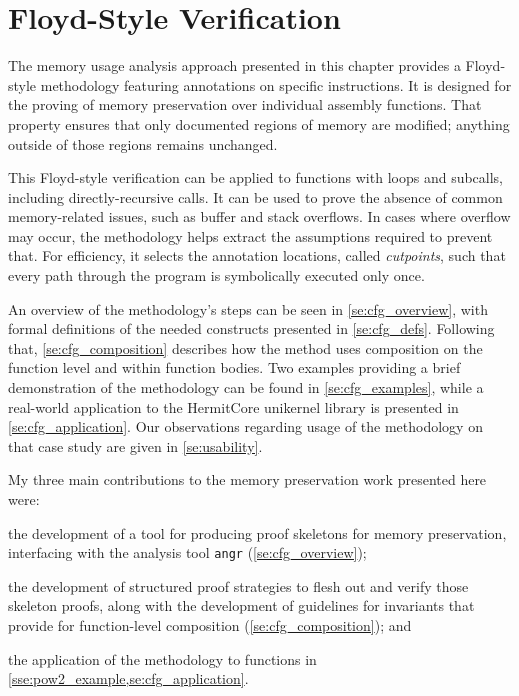 \chapter{Floyd-Style Verification}\label{ch:cfg}
The memory usage analysis approach presented in this chapter
provides a Floyd-style methodology featuring annotations on specific instructions.
It is designed for the proving of memory preservation%
over individual assembly functions.
That property ensures that only documented regions of memory are modified;%
anything outside of those regions remains unchanged.

This Floyd-style verification
can be applied to functions with loops and subcalls,
including directly-recursive calls.
It can be used to prove the absence of common memory-related issues,
such as buffer and stack overflows. In cases where overflow may occur,
the methodology helps extract the assumptions required to prevent that.
For efficiency, it selects the annotation locations,
called \emph{cutpoints},%
such that every path through the program
is symbolically executed only once.%

An overview of the methodology's steps can be seen in \cref{se:cfg_overview},
with formal definitions of the needed constructs presented in \cref{se:cfg_defs}.
Following that, \cref{se:cfg_composition} describes how the method uses composition
on the function level and within function bodies.
Two examples providing a brief demonstration of the methodology
can be found in \cref{se:cfg_examples}, while a real-world application
to the HermitCore unikernel library \autocite{lankes2016hermitcore}
is presented in \cref{se:cfg_application}.
Our observations regarding usage of the methodology on that case study
are given in \cref{se:usability}.

My three main contributions to the memory preservation work presented here were:
\begin{enumerate*}
  \item the development of a tool for producing proof skeletons
  for memory preservation, interfacing with the analysis tool
  \texttt{angr} (\cref{se:cfg_overview});
  \item the development of structured proof strategies
  to flesh out and verify those skeleton proofs,
  along with the development of guidelines
  for invariants that provide for
  function-level composition (\cref{se:cfg_composition});
  and
  \item the application of the methodology to functions in
  \cref{sse:pow2_example,se:cfg_application}.
\end{enumerate*}

